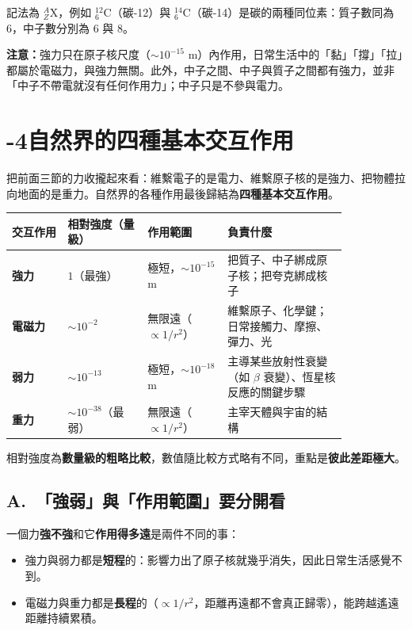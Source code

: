 \documentclass[11pt]{article}
\begin{document}
記法為 ${}^{A}_{Z}\mathrm{X}$，例如 ${}^{12}_{6}\mathrm{C}$（碳-12）與 ${}^{14}_{6}\mathrm{C}$（碳-14）是碳的兩種同位素：質子數同為 6，中子數分別為 6 與 8。

\textbf{注意：}強力只在原子核尺度（$\sim10^{-15}$ m）內作用，日常生活中的「黏」「撐」「拉」都屬於電磁力，與強力無關。此外，中子之間、中子與質子之間都有強力，並非「中子不帶電就沒有任何作用力」；中子只是不參與電力。

\section*{-4\quad 自然界的四種基本交互作用}

把前面三節的力收攏起來看：維繫電子的是電力、維繫原子核的是強力、把物體拉向地面的是重力。自然界的各種作用最後歸結為\textbf{四種基本交互作用}。

\begin{center}
\renewcommand{\arraystretch}{1.35}
\begin{tabular}{p{0.14\linewidth} p{0.20\linewidth} p{0.20\linewidth} p{0.30\linewidth}}
\hline
\textbf{交互作用} & \textbf{相對強度（量級）} & \textbf{作用範圍} & \textbf{負責什麼} \\
\hline
\textbf{強力} & $1$（最強） & 極短，$\sim10^{-15}$ m & 把質子、中子綁成原子核；把夸克綁成核子 \\
\textbf{電磁力} & $\sim10^{-2}$ & 無限遠（$\propto 1/r^2$） & 維繫原子、化學鍵；日常接觸力、摩擦、彈力、光 \\
\textbf{弱力} & $\sim10^{-13}$ & 極短，$\sim10^{-18}$ m & 主導某些放射性衰變（如 $\beta$ 衰變）、恆星核反應的關鍵步驟 \\
\textbf{重力} & $\sim10^{-38}$（最弱） & 無限遠（$\propto 1/r^2$） & 主宰天體與宇宙的結構 \\
\hline
\end{tabular}
\end{center}


相對強度為\textbf{數量級的粗略比較}，數值隨比較方式略有不同，重點是\textbf{彼此差距極大}。

\subsection*{\sffamily A.\ 「強弱」與「作用範圍」要分開看}

一個力\textbf{強不強}和它\textbf{作用得多遠}是兩件不同的事：
\begin{itemize}\setlength{\itemsep}{1pt}
\item 強力與弱力都是\textbf{短程}的：影響力出了原子核就幾乎消失，因此日常生活感覺不到。
\item 電磁力與重力都是\textbf{長程}的（$\propto1/r^2$，距離再遠都不會真正歸零），能跨越遙遠距離持續累積。
\end{itemize}
\end{document}
